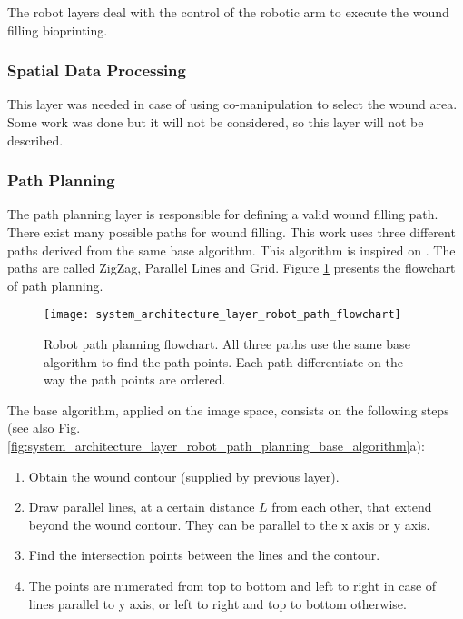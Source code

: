 The robot layers deal with the control of the robotic arm to execute the wound filling bioprinting.

\subsubsection*{Spatial Data Processing}
\label{subsubsec:system_architectural_robot_layers_spatial_data_processing}

This layer was needed in case of using co-manipulation to select the wound area. Some work was done but it will not be considered, so this layer will not be described.


\subsubsection*{Path Planning}
\label{subsubsec:system_architectural_robot_layers_path_planning}

The path planning layer is responsible for defining a valid wound filling path. There exist many possible paths for wound filling. This work uses three different paths derived from the same base algorithm. This algorithm is inspired on \cite{Ding2018_simulated_insitu_bioprinting_wound_bed_path_planning}. The paths are called ZigZag, Parallel Lines and Grid. Figure \ref{fig:system_architecture_layer_robot_path_flowchart} presents the flowchart of path planning.

\begin{figure}[htbp]
	\centering
	\texttt{[image: system\_architecture\_layer\_robot\_path\_flowchart]}
	\caption[Robot path planning flowchart.]{Robot path planning flowchart. All three paths use the same base algorithm to find the path points. Each path differentiate on the way the path points are ordered.}
	\label{fig:system_architecture_layer_robot_path_flowchart}
\end{figure}

The base algorithm, applied on the image space, consists on the following steps (see also Fig. \ref{fig:system_architecture_layer_robot_path_planning_base_algorithm}a):

\begin{enumerate}
    \item Obtain the wound contour (supplied by previous layer).
    \item Draw parallel lines, at a certain distance $L$ from each other, that extend beyond the wound contour. They can be parallel to the x axis or y axis.
    \item Find the intersection points between the lines and the contour.
    \item The points are numerated from top to bottom and left to right in case of lines parallel to y axis, or left to right and top to bottom otherwise.
\end{enumerate}

